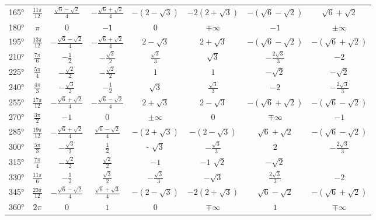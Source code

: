 \begin{table}
\begin{tabular}{cccccccc}
    \ang{165} & $ \frac{11 \pi}{12} $ & $ \frac{\sqrt{6} - \sqrt{2}}{4} $ & $ - \frac{\sqrt{6} + \sqrt{2}}{4} $ & $ - ( 2 - \sqrt{3} ) $ & $ -2 ( 2 + \sqrt{3} ) $ & $ -(\sqrt{6} - \sqrt{2}) $ & $ \sqrt{6}
    + \sqrt{2} $ \\ 
    \ang{180} & $ \pi $ & $ 0 $ & $ -1 $ & $ 0 $ & $ \mp \infty $ & $ -1 $ & $ \pm \infty $ \\
    \ang{195} & $ \frac{13 \pi}{12} $ & $ - \frac{\sqrt{6} - \sqrt{2}}{4} $ & $
    - \frac{\sqrt{6} + \sqrt{2}}{4} $ & $  2 - \sqrt{3} $ & $  2 + \sqrt{3} $ &  $ - (\sqrt{6} - \sqrt{2}) $ & $ - (\sqrt{6} + \sqrt{2}) $ \\ 
    \ang{210} & $ \frac{7 \pi}{6} $ & $ - \frac{1}{2} $ & $ - \frac{\sqrt{3}}{2} $ & $ \frac{\sqrt{3}}{3} $ & $ \sqrt{3} $ & $ - \frac{2 \sqrt{3}}{3} $ & $ -2 $ \\
    \ang{225} & $ \frac{5 \pi}{4} $ & $ - \frac{\sqrt{2}}{2} $ & $ - \frac{\sqrt{2}}{2} $ & $ 1 $ & $ 1 $ & $ - \sqrt{2} $ & $ - \sqrt{2} $ \\
    \ang{240} & $ \frac{4 \pi}{3} $ & $ - \frac{\sqrt{3}}{2} $ & $ - \frac{1}{2} $ & $ \sqrt{3} $ & $ \frac{\sqrt{3}}{3} $ & $ -2 $ & $ - \frac{2 \sqrt{3}}{3} $ \\
    \ang{255} & $ \frac{17 \pi}{12} $ & $ - \frac{\sqrt{6} + \sqrt{2}}{4} $ & $ - \frac{\sqrt{6} - \sqrt{2}}{4} $ & $  2 + \sqrt{3} $ & $  2 - \sqrt{3} $ & $ - (\sqrt{6} + \sqrt{2}) $ & $ - (\sqrt{6} -
    \sqrt{2}) $ \\
    \ang{270} & $ \frac{3 \pi}{2} $ & $ -1 $ & $ 0 $ & $ \pm \infty $ & $ 0 $ & $ \mp \infty $ & $ -1 $ \\
    \ang{285} & $ \frac{19 \pi}{12} $ & $ - \frac{\sqrt{6} + \sqrt{2}}{4} $ & $ \frac{\sqrt{6} - \sqrt{2}}{4} $ & $ - ( 2 + \sqrt{3} ) $ & $ - ( 2 - \sqrt{3}) $ & $ \sqrt{6} + \sqrt{2} $ & $ -(\sqrt{6} -
    \sqrt{2}) $ \\
    \ang{300} & $ \frac{5 \pi}{3} $ & $ - \frac{\sqrt{3}}{2} $ & $ \frac{1}{2} $ & - $\sqrt{3} $ & $ - \frac{\sqrt{3}}{3} $ & $ 2 $ & $ - \frac{2 \sqrt{3}}{3} $ \\    
    \ang{315} & $ \frac{7 \pi}{4} $ & $ - \frac{\sqrt{2}}{2} $ & $ \frac{\sqrt{2}}{2} $ & $ -1 $ & $ -1 $ $ \sqrt{2} $ & $ - \sqrt{2} $ \\
    \ang{330} & $ \frac{11 \pi}{6} $ & $ - \frac{1}{2} $ & $ \frac{\sqrt{3}}{2}$ & $ - \frac{\sqrt{3}}{3} $ & $ - \sqrt{3} $ & $ \frac{2\sqrt{3}}{3} $ & $ - 2 $ \\ 
    \ang{345} & $ \frac{23 \pi}{12} $ & $ - \frac{\sqrt{6} - \sqrt{2}}{4} $ & $ \frac{\sqrt{6} + \sqrt{3}}{4} $ & $ - ( 2 - \sqrt{3}) $ & $ -2 ( 2 + \sqrt{3}) $ & $ \sqrt{6} - \sqrt{2} $ & $ 
    - (\sqrt{6} + \sqrt{2}) $ \\
    \ang{360} & $ 2 \pi $ & $ 0 $ & $ 1 $ & $ 0 $ & $ \mp \infty $ & $ 1 $ & $ \mp \infty $ \\
    \bottomrule
\end{tabular}
\end{table}

